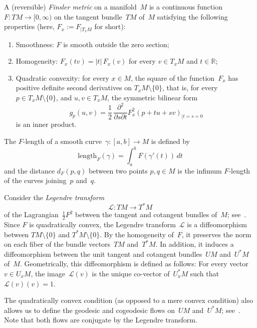 \documentclass[AHL,Unicode,longabstracts,published]{cedram}
\newcommand{\LL}{\mathcal{L}}
\newcommand{\R}{\mathbb{R}}
\newcommand{\length}{\mathrm{length}}
\begin{document}
\begin{defi}\label{def:finsler}
A (reversible) \emph{Finsler metric} on a manifold~$M$ is a continuous function $F:TM \to [0,\infty)$ on the tangent bundle~$TM$ of~$M$ satisfying the following properties (here, $F_x:=F_{|T_x M}$ for short):
\begin{enumerate}
\item\label{item:smooth} Smoothness: $F$ is smooth outside the zero section; 
\item\label{item:homogene} Homogeneity: $F_x(tv) = |t| \, F_x(v)$ for every $v \in T_x M$ and $t \in \R$; 
\item\label{item:convex} Quadratic convexity: for every $x \in M$, the square of the function~$F_x$ has positive definite second derivatives on $T_x M \setminus \{ 0\}$, that is, for every $p\in T_{x}M\setminus\{0\}$, and $u,v \in T_x M$, the symmetric bilinear form
\[
g_p(u,v) = \frac{1}{2} \, \frac{\partial^2}{\partial s \partial t} F_x^2(p+tu+sv)_{|t=s=0}
\]
is an inner product. 
\end{enumerate}


The $F$-length of a smooth curve~$\gamma:[a,b] \to M$ is defined by
\[
\length_F(\gamma) = \int_a^b F(\gamma'(t)) \, dt
\]
and the distance $d_F(p,q)$ between two points $p,q \in M$ is the infimum $F$-length of the curves joining~$p$ and~$q$.

Consider the \emph{Legendre transform}
\begin{equation}\label{eq:Legendre}
\LL:TM\rightarrow T^{*}M
\end{equation}
of the Lagrangian~$\frac{1}{2}F^{2}$ between the tangent and cotangent bundles of~$M$; see~\cite{Be78}. Since $F$ is quadratically convex, the Legendre transform~$\LL$ is a diffeomorphism between $TM \setminus\{0\}$ and $T^{*}M\setminus\{0\}$. By the homogeneity of~$F$, it preserves the norm on each fiber of the bundle vectors~$TM$ and~$T^{*}M$. In addition, it induces a diffeomorphism between the unit tangent and cotangent bundles~$UM$ and~$U^{*}M$ of~$M$. Geometrically, this diffeomorphism is defined as follows: For every vector $v\in U_{x}M$, the image~$\LL(v)$ is the unique co-vector of~$U_{x}^{*}M$ such that $\LL(v)(v)=1$.

The quadratically convex condition (as opposed to a mere convex condition) also allows us to define the geodesic and cogeodesic flows on~$UM$ and~$U^*M$; see~\cite{Be78}. Note that both flows are conjugate by the Legendre transform.



\end{defi}
\end{document}
